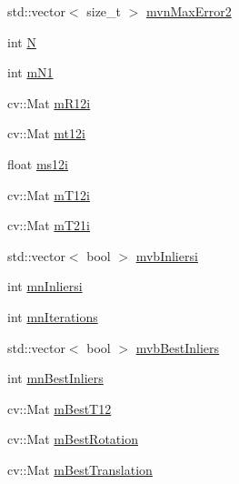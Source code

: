 \begin{DoxyCompactItemize}
\item 
std\+::vector$<$ size\+\_\+t $>$ \mbox{\hyperlink{class_o_r_b___s_l_a_m2_1_1_sim3_solver_a26ca815b24366cf32e9ce065be4ab8a7}{mvn\+Max\+Error2}}
\item 
int \mbox{\hyperlink{class_o_r_b___s_l_a_m2_1_1_sim3_solver_a8081f9438c71d5cdf9fc2aacf985136c}{N}}
\item 
int \mbox{\hyperlink{class_o_r_b___s_l_a_m2_1_1_sim3_solver_a366db3149066adadf76fa4f4ecb39d50}{m\+N1}}
\item 
cv\+::\+Mat \mbox{\hyperlink{class_o_r_b___s_l_a_m2_1_1_sim3_solver_afc5eba1e475226a4ab7f0d0de8fc6e48}{m\+R12i}}
\item 
cv\+::\+Mat \mbox{\hyperlink{class_o_r_b___s_l_a_m2_1_1_sim3_solver_a7747196dceb3ef3d2dc341e7aff798aa}{mt12i}}
\item 
float \mbox{\hyperlink{class_o_r_b___s_l_a_m2_1_1_sim3_solver_a6ba87aac963290a1b18172573890a50a}{ms12i}}
\item 
cv\+::\+Mat \mbox{\hyperlink{class_o_r_b___s_l_a_m2_1_1_sim3_solver_a299a04a059df22bd4b7938a4ade791c3}{m\+T12i}}
\item 
cv\+::\+Mat \mbox{\hyperlink{class_o_r_b___s_l_a_m2_1_1_sim3_solver_add3bff26c47ec9d454ea3efe92630e77}{m\+T21i}}
\item 
std\+::vector$<$ bool $>$ \mbox{\hyperlink{class_o_r_b___s_l_a_m2_1_1_sim3_solver_a0c909819990b1b62edc9aba6c7e7d94f}{mvb\+Inliersi}}
\item 
int \mbox{\hyperlink{class_o_r_b___s_l_a_m2_1_1_sim3_solver_abc2d59150f4f6f446032cdb6bb77ee43}{mn\+Inliersi}}
\item 
int \mbox{\hyperlink{class_o_r_b___s_l_a_m2_1_1_sim3_solver_a2fc877cd37c96ad164bbf36f2a6cd5e9}{mn\+Iterations}}
\item 
std\+::vector$<$ bool $>$ \mbox{\hyperlink{class_o_r_b___s_l_a_m2_1_1_sim3_solver_ac2f1c6a9abd3fef76f18ab0e9665e2ea}{mvb\+Best\+Inliers}}
\item 
int \mbox{\hyperlink{class_o_r_b___s_l_a_m2_1_1_sim3_solver_af19a65050bd50bcf65f7cf48683c8045}{mn\+Best\+Inliers}}
\item 
cv\+::\+Mat \mbox{\hyperlink{class_o_r_b___s_l_a_m2_1_1_sim3_solver_adb1eeb9e1774d656c4e8c77f5fc57539}{m\+Best\+T12}}
\item 
cv\+::\+Mat \mbox{\hyperlink{class_o_r_b___s_l_a_m2_1_1_sim3_solver_a69cf052880d6e926e11b74e1b59a05e0}{m\+Best\+Rotation}}
\item 
cv\+::\+Mat \mbox{\hyperlink{class_o_r_b___s_l_a_m2_1_1_sim3_solver_a9aca06ce2678d686a318266fe3262a0b}{m\+Best\+Translation}}

\end{DoxyCompactItemize}
